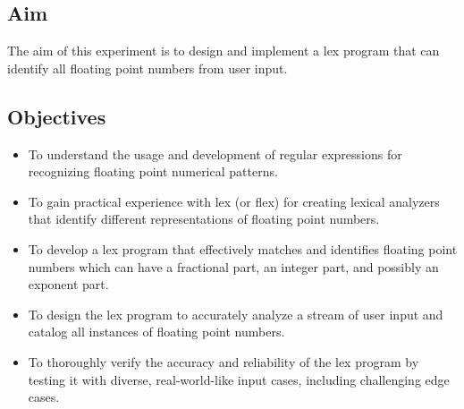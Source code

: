 \documentclass[12pt]{article}
\begin{document}
\subsection*{Aim}
The aim of this experiment is to design and implement a lex program that can identify all floating point numbers from user input.

\subsection*{Objectives}
\begin{itemize}
    \item To understand the usage and development of regular expressions for recognizing floating point numerical patterns.
    \item To gain practical experience with lex (or flex) for creating lexical analyzers that identify different representations of floating point numbers.
    \item To develop a lex program that effectively matches and identifies floating point numbers which can have a fractional part, an integer part, and possibly an exponent part.
    \item To design the lex program to accurately analyze a stream of user input and catalog all instances of floating point numbers.
    \item To thoroughly verify the accuracy and reliability of the lex program by testing it with diverse, real-world-like input cases, including challenging edge cases.
\end{itemize}
\end{document}
